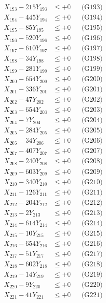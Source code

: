 \documentclass[a4paper,10pt]{article}
\begin{document}
{\begin{align}
X_{193} - 215Y_{193} &\leq +0 && \text{(G193)} \\
X_{194} - 445Y_{194} &\leq +0 && \text{(G194)} \\
X_{195} - 85Y_{195} &\leq +0 && \text{(G195)} \\
X_{196} - 520Y_{196} &\leq +0 && \text{(G196)} \\
X_{197} - 610Y_{197} &\leq +0 && \text{(G197)} \\
X_{198} - 34Y_{198} &\leq +0 && \text{(G198)} \\
X_{199} - 281Y_{199} &\leq +0 && \text{(G199)} \\
X_{200} - 654Y_{200} &\leq +0 && \text{(G200)} \\
\allowbreak
X_{201} - 336Y_{201} &\leq +0 && \text{(G201)} \\
X_{202} - 47Y_{202} &\leq +0 && \text{(G202)} \\
X_{203} - 654Y_{203} &\leq +0 && \text{(G203)} \\
X_{204} - 7Y_{204} &\leq +0 && \text{(G204)} \\
X_{205} - 284Y_{205} &\leq +0 && \text{(G205)} \\
X_{206} - 34Y_{206} &\leq +0 && \text{(G206)} \\
X_{207} - 407Y_{207} &\leq +0 && \text{(G207)} \\
X_{208} - 240Y_{208} &\leq +0 && \text{(G208)} \\
X_{209} - 603Y_{209} &\leq +0 && \text{(G209)} \\
X_{210} - 340Y_{210} &\leq +0 && \text{(G210)} \\
\allowbreak
X_{211} - 126Y_{211} &\leq +0 && \text{(G211)} \\
X_{212} - 204Y_{212} &\leq +0 && \text{(G212)} \\
X_{213} - 2Y_{213} &\leq +0 && \text{(G213)} \\
X_{214} - 614Y_{214} &\leq +0 && \text{(G214)} \\
X_{215} - 10Y_{215} &\leq +0 && \text{(G215)} \\
X_{216} - 654Y_{216} &\leq +0 && \text{(G216)} \\
X_{217} - 51Y_{217} &\leq +0 && \text{(G217)} \\
X_{218} - 602Y_{218} &\leq +0 && \text{(G218)} \\
X_{219} - 14Y_{219} &\leq +0 && \text{(G219)} \\
X_{220} - 9Y_{220} &\leq +0 && \text{(G220)} \\
\allowbreak
X_{221} - 41Y_{221} &\leq +0 && \text{(G221)} \\

\end{align}}
\end{document}
